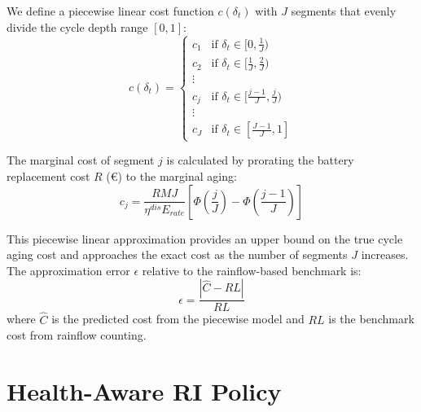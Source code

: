 \documentclass[10pt,twocolumn]{article}
\begin{document}
We define a piecewise linear cost function $c(\delta_t)$ with $J$ segments that evenly divide the cycle depth range $[0, 1]$:
\begin{equation}
c(\delta_t) = \begin{cases}
c_1 & \text{if } \delta_t \in [0, \frac{1}{J}) \\
c_2 & \text{if } \delta_t \in [\frac{1}{J}, \frac{2}{J}) \\
\vdots \\
c_j & \text{if } \delta_t \in [\frac{j-1}{J}, \frac{j}{J}) \\
\vdots \\
c_J & \text{if } \delta_t \in [\frac{J-1}{J}, 1]
\end{cases}
\label{eq:piecewise_cost}
\end{equation}

The marginal cost of segment $j$ is calculated by prorating the battery replacement cost $R$ (€) to the marginal aging:
\begin{equation}
c_j = \frac{R M J}{\eta^{dis} E_{rate}} \left[ \Phi\left(\frac{j}{J}\right) - \Phi\left(\frac{j-1}{J}\right) \right]
\label{eq:segment_cost}
\end{equation}

This piecewise linear approximation provides an upper bound on the true cycle aging cost and approaches the exact cost as the number of segments $J$ increases. The approximation error $\epsilon$ relative to the rainflow-based benchmark is:
\begin{equation}
\epsilon = \frac{|\hat{C} - RL|}{RL}
\label{eq:approximation_error}
\end{equation}
where $\hat{C}$ is the predicted cost from the piecewise model and $RL$ is the benchmark cost from rainflow counting.

\section{Health-Aware RI Policy}
\end{document}
